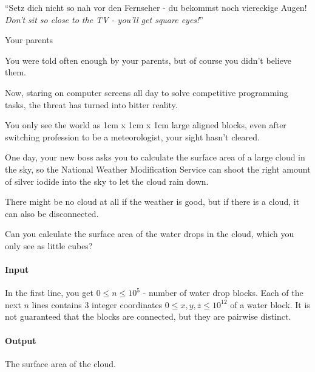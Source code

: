 

\usepackage{epigraph}



\makeheader

\epigraph{``Setz dich nicht so nah vor den Fernseher - du bekommst noch
  viereckige Augen!\\ \textit{Don't sit so close to the TV - you'll get square
    eyes!}''}{Your parents}

You were told often enough by your parents, but of course you didn't believe them.

Now, staring on computer screens all day to solve competitive programming tasks, the threat has turned into bitter reality.

You only see the world as 1cm x 1cm x 1cm large aligned blocks, even after switching profession to be a meteorologist, your sight hasn't cleared.

One day, your new boss asks you to calculate the surface area of a large cloud in the sky, so the National Weather Modification Service can shoot the right amount of silver iodide into the sky to let the cloud rain down.

There might be no cloud at all if the weather is good, but if there is a cloud, it can also be disconnected.

Can you calculate the surface area of the water drops in the cloud, which you only see as little cubes?

\paragraph*{Input}

In the first line, you get $0 \leq n \leq 10^5$ - number of water drop blocks.
Each of the next $n$ lines contains 3 integer coordinates $0 \leq x, y, z \leq 10^{12}$ of a water block. It is not guaranteed that the blocks are connected, but they are pairwise distinct.

\paragraph*{Output}

The surface area of the cloud.

\begin{samples}
\end{samples}

